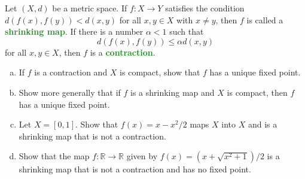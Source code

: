 \documentclass[10pt]{article}
\providecommand{\RR}{\mathbb R}
\providecommand{\ii}{\item}
\providecommand{\vocab}[1]{{\textbf{\textcolor{ForestGreen}{#1}}}}
\begin{document}
\begin{problem}
    [Munkres 28.7]
    Let $(X,d)$ be a metric space. If $f\colon X\to Y$ satisfies the condition
    $d(f(x),f(y)) < d(x,y)$ for all $x,y\in X$ with $x\ne y$,
    then $f$ is called a \vocab{shrinking map}.
    If there is a number $\alpha < 1$ such that
    \begin{equation*}
        d(f(x),f(y)) \le \alpha d(x,y)
    \end{equation*}
    for all $x,y\in X$, then $f$ is a \vocab{contraction}.
    \begin{enumerate}[(a)]
        \ii If $f$ is a contraction and $X$ is compact,
	show that $f$ has a unique fixed point.
	\ii Show more generally that if $f$ is a shrinking map and $X$ is compact,
	then $f$ has a unique fixed point.
	\ii Let $X = [0,1]$. Show that $f(x) = x - x^2/2$
	maps $X$ into $X$ and is a shrinking map that is not a contraction.
	\ii Show that the map $f\colon\RR\to\RR$ given by
	$f(x) = (x + \sqrt{x^2 + 1})/2$ is a shrinking map
	that is not a contraction and has no fixed point.
    \end{enumerate}
\end{problem}
\end{document}
